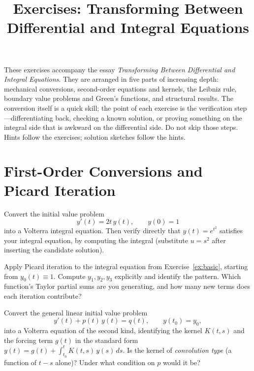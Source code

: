 \documentclass{essay}
\title{Exercises: Transforming Between Differential and Integral Equations}
\author{}
\date{}
\begin{document}
\maketitle

These exercises accompany the essay \emph{Transforming Between Differential and Integral Equations}. They are arranged in five parts of increasing depth: mechanical conversions, second-order equations and kernels, the Leibniz rule, boundary value problems and Green's functions, and structural results. The conversion itself is a quick skill; the point of each exercise is the verification step---differentiating back, checking a known solution, or proving something on the integral side that is awkward on the differential side. Do not skip those steps. Hints follow the exercises; solution sketches follow the hints.

\section{First-Order Conversions and Picard Iteration}

\begin{exercise}\label{ex:basic}
  Convert the initial value problem
  \[
    y'(t) = 2t\,y(t), \qquad y(0) = 1
  \]
  into a Volterra integral equation. Then verify directly that $y(t) = e^{t^2}$ satisfies your integral equation, by computing the integral (substitute $u = s^2$ after inserting the candidate solution).
\end{exercise}

\begin{exercise}\label{ex:picard}
  Apply Picard iteration to the integral equation from Exercise~\ref{ex:basic}, starting from $y_0(t) \equiv 1$. Compute $y_1, y_2, y_3$ explicitly and identify the pattern. Which function's Taylor partial sums are you generating, and how many new terms does each iteration contribute?
\end{exercise}

\begin{exercise}\label{ex:linear}
  Convert the general linear initial value problem
  \[
    y'(t) + p(t)\,y(t) = q(t), \qquad y(t_0) = y_0,
  \]
  into a Volterra equation of the second kind, identifying the kernel $K(t,s)$ and the forcing term $g(t)$ in the standard form $y(t) = g(t) + \int_{t_0}^{t} K(t,s)\,y(s)\,ds$. Is the kernel of \emph{convolution type} (a function of $t - s$ alone)? Under what condition on $p$ would it be?
\end{exercise}
\end{document}
